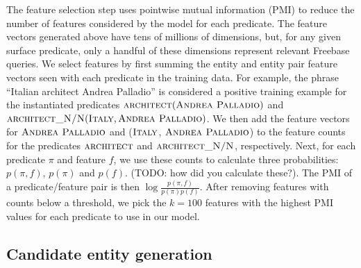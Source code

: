 \documentclass[11pt]{article}
\newcommand{\formalpredicate}[1]{\ensuremath{\textsc{#1}}}
\newcommand{\entity}[1]{\ensuremath{\textsc{#1}}}
\begin{document}

The feature selection step uses pointwise mutual information (PMI) to
reduce the number of features considered by the model for each
predicate. The feature vectors generated above have tens of millions
of dimensions, but, for any given surface predicate, only a handful of
these dimensions represent relevant Freebase queries. We select
features by first summing the entity and entity pair feature vectors
seen with each predicate in the training data. For example, the phrase
``Italian architect Andrea Palladio'' is considered a positive
training example for the instantiated predicates
$\formalpredicate{architect}(\entity{Andrea Palladio})$ and
$\formalpredicate{architect\_N/N}(\entity{Italy}, \entity{Andrea
  Palladio})$. We then add the feature vectors for \entity{Andrea
  Palladio} and (\entity{Italy}, \entity{Andrea Palladio}) to the
feature counts for the predicates \formalpredicate{architect} and
\formalpredicate{architect\_N/N}, respectively. Next, for each predicate
$\pi$ and feature $f$, we use these counts to calculate three
probabilities: $p(\pi, f)$, $p(\pi)$ and $p(f)$. (TODO: how did you
calculate these?). The PMI of a predicate/feature pair is then $\log
\frac{p(\pi, f)}{p(\pi)p(f)}$. After removing features with counts
below a threshold, we pick the $k=100$ features with the highest PMI
values for each predicate to use in our model.



\subsection{Candidate entity generation}
\label{sec:better-candidates}
\end{document}
